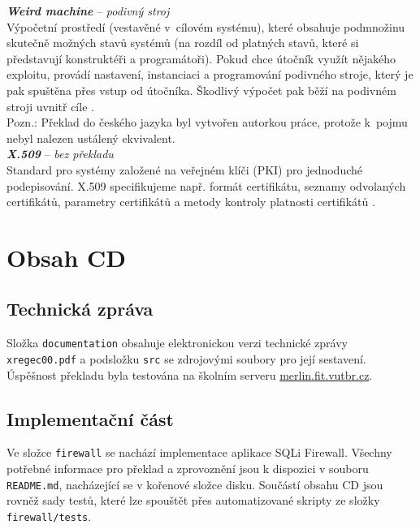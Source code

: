 \textit{\textbf{Weird machine}} -- \textit{podivný stroj} \label{app:a:weirdmachine} \\
Výpočetní prostředí (vestavěné v~cílovém systému), které obsahuje podmnožinu skutečně možných stavů systémů (na rozdíl od platných stavů, které si představují konstruktéři a programátoři). Pokud chce útočník využít nějakého exploitu, provádí nastavení, instanciaci a programování podivného stroje, který je pak spuštěna přes vstup od útočníka. Škodlivý výpočet pak běží na podivném stroji uvnitř cíle \cite[str. 20]{Sass2011}. \\
Pozn.: Překlad do českého jazyka byl vytvořen autorkou práce, protože k~pojmu nebyl \mbox{nalezen} ustálený ekvivalent. \\

\textit{\textbf{X.509}} -- \textit{bez překladu} \label{app:a:x.509} \\ %
Standard pro systémy založené na veřejném klíči (PKI) pro jednoduché podepisování. X.509 specifikujeme např. formát certifikátu, seznamy odvolaných certifikátů, 
parametry \mbox{certifikátů} a metody kontroly platnosti certifikátů \cite[str. 130]{Slovnik2015}. \\

\chapter{Obsah CD} \label{app:cd}

\section{Technická zpráva}
Složka \texttt{documentation} obsahuje elektronickou verzi technické zprávy \texttt{xregec00.pdf} a podsložku \texttt{src} se zdrojovými soubory pro 
její sestavení. Úspěšnost překladu byla testována na školním serveru \url{merlin.fit.vutbr.cz}.

\section{Implementační část}
Ve složce \texttt{firewall} se nachází implementace aplikace SQLi Firewall. Všechny potřebné informace pro překlad a zprovoznění jsou k dispozici
v souboru \texttt{README.md}, nacházející se v kořenové složce disku. Součástí obsahu CD jsou rovněž sady testů, které lze spouštět přes automatizované
skripty ze složky \texttt{firewall/tests}. 
